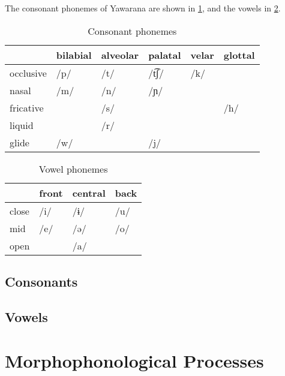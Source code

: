 \documentclass{memoir}
\begin{document}
The consonant phonemes of Yawarana are shown in \cref{tab:consonants},
and the vowels in \cref{tab:vowels}.

\begin{table}
\caption{Consonant phonemes}
\label{tab:consonants}
\centering
\begin{tabular}{llllll}
\toprule
          & bilabial & alveolar & palatal & velar & glottal \\
\midrule
occlusive &     /p/  &     /t/  &  /t͡ʃ/  &   /k/ &         \\
    nasal &     /m/  &     /n/  &    /ɲ/  &       &         \\
fricative &          &     /s/  &         &       &    /h/  \\
   liquid &          &     /r/  &         &       &         \\
    glide &     /w/  &          &     /j/ &       &         \\
\bottomrule
\end{tabular}

\end{table}

\begin{table}
\caption{Vowel phonemes}
\label{tab:vowels}
\centering
\begin{tabular}{llll}
\toprule
      & front & central & back \\
\midrule
close &  /i/  &    /ɨ/  & /u/  \\
  mid &  /e/  &    /ə/  & /o/  \\
 open &       &    /a/  &      \\
\bottomrule
\end{tabular}

\end{table}

\subsection{\texorpdfstring{Consonants
\label{sec:consonants}}{Consonants }}

\subsection{\texorpdfstring{Vowels \label{sec:vowels}}{Vowels }}

\section{\texorpdfstring{Morphophonological Processes
\label{sec:morphophono}}{Morphophonological Processes }}
\end{document}
